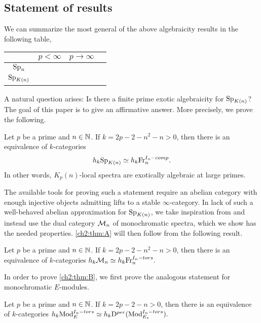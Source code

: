 \subsection*{Statement of results}

We can summarize the most general of the above algebraicity results in the following table,
\begin{table}[h]
    \centering
    \begin{tabular}{c|ccc}
        & $p<\infty $ & $p\rightarrow \infty$ \\
        \hline 
        $\mathrm{Sp}_{n}$& \cite{patchkoria-pstragowski_2021} & \cite{barthel-schlank-stapleton_2020} \\
        $\mathrm{Sp}_{K(n)}$ &  & \cite{barthel-schlank-stapleton_2021} 
    \end{tabular}
\end{table}

A natural question arises: Is there a finite prime exotic algebraicity for $\mathrm{Sp}_{K(n)}$? The goal of this paper is to give an affirmative answer. More precisely, we prove the following. 

\begin{introthm}
    \label{ch2:thm:A}
    Let $p$ be a prime and $n\in \mathbb{N}$. If $k=2p-2-n^2-n>0$,  then there is an equivalence of $k$-categories 
    $$h_k \mathrm{Sp}_{K(n)}\simeq h_k \mathrm{Fr}_{n}^{I_n-comp}.$$
    In other words, $K_p(n)$-local spectra are exotically algebraic at large primes. 
\end{introthm}

The available tools for proving such a statement require an abelian category with enough injective objects admitting lifts to a stable $\infty$-category. In lack of such a well-behaved abelian approximation for $\mathrm{Sp}_{K(n)}$, we take inspiration from \cite{barthel-schlank-stapleton_2021} and instead use the dual category $\mathcal{M}_{n}$ of monochromatic spectra, which we show has the needed properties. \cref{ch2:thm:A} will then follow from the following result. 

\begin{introthm}
    \label{ch2:thm:B}
    Let $p$ be a prime and $n\in \mathbb{N}$. If $k=2p-2-n^2-n>0$,  then there is an equivalence of $k$-categories $h_k \mathcal{M}_{n}\simeq h_k \mathrm{Fr}_{n}^{I_n-tors}.$
\end{introthm}

In order to prove \cref{ch2:thm:B}, we first prove the analogous statement for monochromatic $E$-modules. 
    
\begin{introthm}
    \label{ch2:thm:C}
    Let $p$ be a prime and $n\in \mathbb{N}$. If $k=2p-2-n>0$,  then there is an equivalence of $k$-categories $h_k \mathrm{Mod}_{E}^{I_n-tors}\simeq h_k \mathrm{D}^{per}(\mathrm{Mod}_{E_*}^{I_n-tors}).$
\end{introthm}


